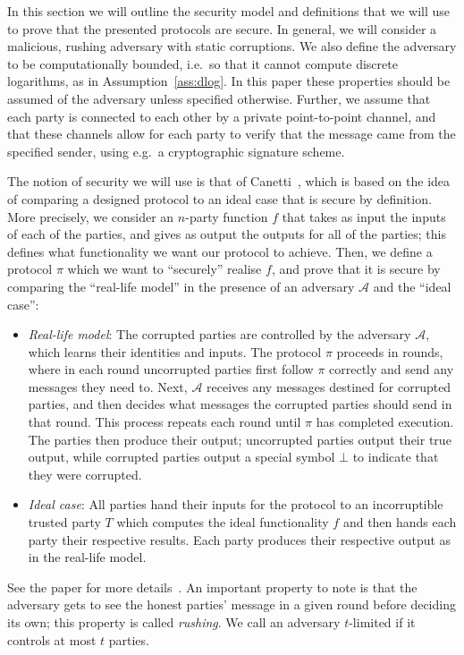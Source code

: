 \documentclass{article}
\newcommand\paper{paper}
\theoremstyle{remark}
\begin{document}
\newcommand{\ideal}[4]{\textup{\texttt{IDEAL}}_{#1, #2} (#3, #4)}
\newcommand{\idealD}{\ideal{\proto}{\mathcal{S}}{x}{z}}

In this section we will outline the security model and definitions that we will
use to prove that the presented protocols are secure. In general, we will
consider a malicious, rushing adversary with static corruptions. We also define
the adversary to be computationally bounded, i.e.\ so that it cannot compute
discrete logarithms, as in Assumption~\ref{ass:dlog}. In this \paper{} these
properties should be assumed of the adversary unless specified otherwise.
Further, we assume that each party is connected to each other by a private
point-to-point channel, and that these channels allow for each party to verify
that the message came from the specified sender, using e.g.\ a cryptographic
signature scheme.

The notion of security we will use is that of Canetti~\cite{c00}, which is
based on the idea of comparing a designed protocol to an ideal case that is
secure by definition. More precisely, we consider an $n$-party function $f$
that takes as input the inputs of each of the parties, and gives as output the
outputs for all of the parties; this defines what functionality we want our
protocol to achieve. Then, we define a protocol $\pi$ which we want to
``securely'' realise $f$, and prove that it is secure by comparing the
``real-life model'' in the presence of an adversary $\mathcal{A}$ and the
``ideal case'':
\begin{itemize}
	\item \textit{Real-life model}: The corrupted parties are controlled by the
		adversary $\mathcal{A}$, which learns their identities and inputs. The
		protocol $\pi$ proceeds in rounds, where in each round uncorrupted
		parties first follow $\pi$ correctly and send any messages they need
		to. Next, $\mathcal{A}$ receives any messages destined for corrupted
		parties, and then decides what messages the corrupted parties should
		send in that round. This process repeats each round until $\pi$ has
		completed execution. The parties then produce their output; uncorrupted
		parties output their true output, while corrupted parties output a
		special symbol $\bot$ to indicate that they were corrupted.

	\item \textit{Ideal case}: All parties hand their inputs for the protocol
		to an incorruptible trusted party $T$ which computes the ideal
		functionality $f$ and then hands each party their respective results.
		Each party produces their respective output as in the real-life model.
\end{itemize}
See the paper for more details~\cite{c00}. An important property to note is
that the adversary gets to see the honest parties' message in a given round
before deciding its own; this property is called \textit{rushing}. We call an
adversary $t$-limited if it controls at most $t$ parties.
\end{document}
